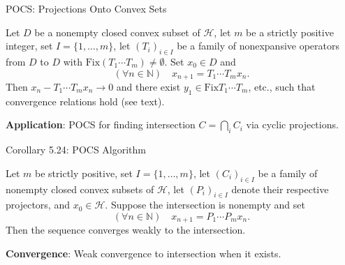 \documentclass[aspectratio=169,10pt]{beamer}
\begin{document}
\begin{frame}{POCS: Projections Onto Convex Sets}
    \begin{theorem}[Theorem 5.23]
        Let $D$ be a nonempty closed convex subset of $\mathcal{H}$, let $m$ be a strictly positive integer, set $I = \{1, \ldots, m\}$, let $(T_i)_{i \in I}$ be a family of nonexpansive operators from $D$ to $D$ with $\text{Fix}(T_1 \cdots T_m) \neq \emptyset$.
        Set $x_0 \in D$ and
        \[
            (\forall n \in \mathbb{N}) \quad x_{n+1} = T_1 \cdots T_m x_n.
        \]
        Then $x_n - T_1 \cdots T_m x_n \to 0$ and there exist $y_1 \in \text{Fix} T_1 \cdots T_m$, etc., such that
        convergence relations hold (see text).
    \end{theorem}

    \vspace{0.3cm}

    \textbf{Application}: POCS for finding intersection $C = \bigcap_i C_i$ via cyclic projections.
\end{frame}

\begin{frame}{Corollary 5.24: POCS Algorithm}
    \begin{corollary}
        Let $m$ be strictly positive, set $I = \{1, \ldots, m\}$, let $(C_i)_{i \in I}$ be a family of nonempty closed convex subsets of $\mathcal{H}$, let $(P_i)_{i \in I}$ denote their respective projectors, and $x_0 \in \mathcal{H}$.
        Suppose the intersection is nonempty and set
        \[
            (\forall n \in \mathbb{N}) \quad x_{n+1} = P_1 \cdots P_m x_n.
        \]
        Then the sequence converges weakly to the intersection.
    \end{corollary}

    \vspace{0.3cm}

    \textbf{Convergence}: Weak convergence to intersection when it exists.
\end{frame}
\end{document}
